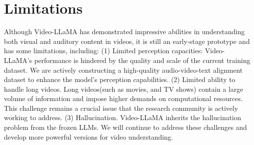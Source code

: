\section{Limitations}
Although Video-LLaMA has demonstrated impressive abilities in understanding both visual and auditory content in videos, it is still an early-stage prototype and has some limitations, including:
(1) Limited perception capacities: Video-LLaMA's performance is hindered by the quality and scale of the current training dataset. We are actively constructing a high-quality audio-video-text alignment dataset to enhance the model's perception capabilities. 
(2) Limited ability to handle long videos. Long videos(such as movies, and TV shows) contain a large volume of information and impose higher demands on computational resources. This challenge remains a crucial issue that the research community is actively working to address.
(3) Hallucination. Video-LLaMA inherits the hallucination problem from the frozen LLMs. We will continue to address these challenges and develop more powerful versions for video understanding.

\clearpage

